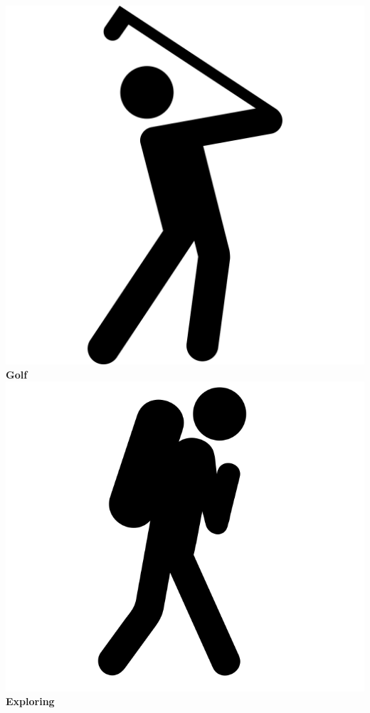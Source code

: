 \documentclass[]{friggeri-cv}
\begin{document}
\begin{aside}
        \includegraphics[scale=0.03]{img/golf.png} 
    \textbf{Golf}
        \includegraphics[scale=0.06]{img/exploring.png} 
    \textbf{Exploring}

\end{aside}
\end{document}
